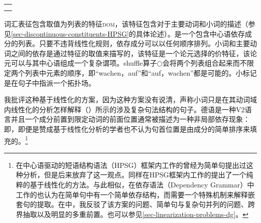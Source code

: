 \begin{exe}
\begin{xlist}[iv.]
\begin{exe}
\begin{xlist}[iv.]
\begin{tabular}{@{}l@{}}
{{{                    }
            }\\
}
\end{tabular}
\zs
词汇表征包含取值为列表的特征\textsc{dom}，该特征包含对于主要动词和小词的描述（参见\ref{sec-discontinuous-constituents-HPSG}的具体论述）。\domlc 是一个包含中心语依存成分的列表。只要不违背线性化规则，依存成分可以以任何顺序排列\citep{Reape94a}。小词和主要动词之间的依存是通过特征\vcompc 的取值来描写的，该特征是一个论元选择的价特征，该论元可以与其中心语组成一个复杂谓项。shuffle算子$\bigcirc$会将两个列表组合起来而不限定两个列表中元素的顺序，即“wachen，auf”和“auf，wachen”都是可能的。小标记是在句子中指派一个拓扑场。

我批评这种基于线性化的方案，因为这种方案没有说清，声称小词只是在其动词域内线性化的分析怎样解释（）所示的涉及复杂句法结构的句子\citep{Mueller2007d}。德语是一种V2语言并且一个成分前置到限定动词的前面位置通常被描述为一种非局部依存现象：即，即便是赞成基于线性化分析的学者也不认为句首位置是由成分的简单排序来填充的\citep{Kathol2000a,Mueller99a,Mueller2002b,TBjerre2006a}。\footnote{%
  在中心语驱动的短语结构语法\indexhpsgc（HPSG）框架内工作的\citet[\S~6.3]{Kathol95a}曾经为简单句提出过这种分析，但是后来放弃了这一观点。同样在HPSG框架内工作的\citet{Wetta2011a}提出了一个纯粹的基于线性化的方法。与此相似，在依存语法\indexdgc（Dependency Grammar）中工作的\citet{GO2009a}也认为在简单句中有一个简单依存结构，而需要一个特殊机制来解释嵌套句的提取。在中，我反驳了该方案的问题、简单句与复杂句并列的问题、跨界抽取以及明显的多重前置。也可以参见\ref{sec-linearization-problems-dg}。
}


\end{xlist}
\end{exe}
\end{xlist}
\end{exe}
